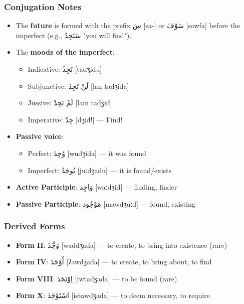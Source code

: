 \documentclass[letterpaper,12pt]{article}
\begin{document}
\subsubsection*{Conjugation Notes}
\begin{itemize}
  \item The \textbf{future} is formed with the prefix \textarabic{سَ} [sa-] or \textarabic{سَوْفَ} [sawfa] before the imperfect (e.g., \textarabic{سَتَجِدُ} "you will find").
  \item The \textbf{moods of the imperfect}: 
    \begin{itemize}
      \item Indicative: \textarabic{تَجِدُ} [tadʒidu] 
      \item Subjunctive: \textarabic{لَنْ تَجِدَ} [lan tadʒida]
      \item Jussive: \textarabic{لَمْ تَجِدْ} [lam tadʒid]
      \item Imperative: \textarabic{جِدْ} [dʒid!] — Find!
    \end{itemize}
  \item \textbf{Passive voice}: 
    \begin{itemize}
      \item Perfect: \textarabic{وُجِدَ} [wudʒida] — it was found
      \item Imperfect: \textarabic{يُوجَدُ} [juːdʒadu] — it is found/exists
    \end{itemize}
  \item \textbf{Active Participle}: \textarabic{وَاجِد} [waːdʒid] — finding, finder
  \item \textbf{Passive Participle}: \textarabic{مَوْجُود} [mawdʒuːd] — found, existing
\end{itemize}

\subsubsection*{Derived Forms}
\begin{itemize}
  \item \textbf{Form II}: \textarabic{وَجَّدَ} [waddʒada] — to create, to bring into existence (rare)
  \item \textbf{Form IV}: \textarabic{أَوْجَدَ} [ʔawdʒada] — to create, to bring about, to find
  \item \textbf{Form VIII}: \textarabic{اِوْتَجَدَ} [iwtadʒada] — to be found (rare)
  \item \textbf{Form X}: \textarabic{اسْتَوْجَدَ} [istawdʒada] — to deem necessary, to require
\end{itemize}
\end{document}
